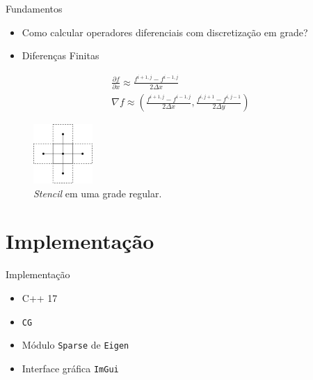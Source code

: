\documentclass[aspectratio=169,xcolor=dvipsnames]{beamer}
\begin{document}
\begin{frame}{Fundamentos}
    
    {
    \begin{itemize}
        \item Como calcular operadores diferenciais com discretização em grade?
    \end{itemize}
    }
    
    {
    \begin{itemize}
        \item Diferenças Finitas
    \end{itemize}
    \begin{gather}
        \frac{\partial f}{\partial x} \approx \frac{f^{i+1, j} - f^{i-1,j}}{2\Delta x} \\
        \nabla f \approx \left( \frac{f^{i+1, j} - f^{i-1,j}}{2\Delta x}, \frac{f^{i, j+1} - f^{i,j-1}}{2\Delta y} \right)
    \end{gather}

    \begin{figure}
        \centering
        \includegraphics[width=0.20\textwidth]{figures/Stencil.pdf}
        \caption{\textit{Stencil} em uma grade regular.}
        \label{fig:stencil}
    \end{figure}
    }
    
\end{frame}



\section{Implementação}

\begin{frame}{Implementação}
    \begin{itemize}
        \item C++ 17
        \item \texttt{CG}
        \item Módulo \texttt{Sparse} de \texttt{Eigen}
        \item Interface gráfica \texttt{ImGui}
    \end{itemize}
\end{frame}
\end{document}
